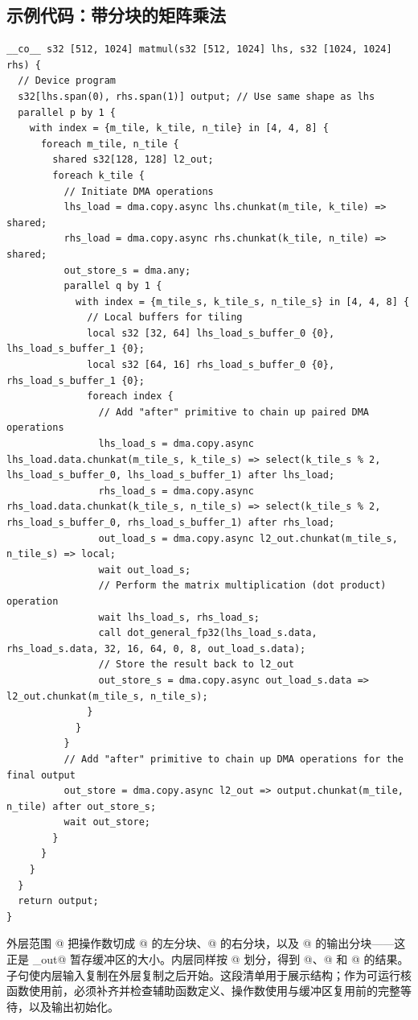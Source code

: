\subsection*{示例代码：带分块的矩阵乘法}

\begin{lstlisting}[language=croqtile,caption={示例代码：带分块的矩阵乘法}]
__co__ s32 [512, 1024] matmul(s32 [512, 1024] lhs, s32 [1024, 1024] rhs) {
  // Device program
  s32[lhs.span(0), rhs.span(1)] output; // Use same shape as lhs
  parallel p by 1 {
    with index = {m_tile, k_tile, n_tile} in [4, 4, 8] {
      foreach m_tile, n_tile {
        shared s32[128, 128] l2_out;
        foreach k_tile {
          // Initiate DMA operations
          lhs_load = dma.copy.async lhs.chunkat(m_tile, k_tile) => shared;
          rhs_load = dma.copy.async rhs.chunkat(k_tile, n_tile) => shared;
          out_store_s = dma.any;
          parallel q by 1 {
            with index = {m_tile_s, k_tile_s, n_tile_s} in [4, 4, 8] {
              // Local buffers for tiling
              local s32 [32, 64] lhs_load_s_buffer_0 {0}, lhs_load_s_buffer_1 {0};
              local s32 [64, 16] rhs_load_s_buffer_0 {0}, rhs_load_s_buffer_1 {0};
              foreach index {
                // Add "after" primitive to chain up paired DMA operations
                lhs_load_s = dma.copy.async lhs_load.data.chunkat(m_tile_s, k_tile_s) => select(k_tile_s % 2, lhs_load_s_buffer_0, lhs_load_s_buffer_1) after lhs_load;
                rhs_load_s = dma.copy.async rhs_load.data.chunkat(k_tile_s, n_tile_s) => select(k_tile_s % 2, rhs_load_s_buffer_0, rhs_load_s_buffer_1) after rhs_load;
                out_load_s = dma.copy.async l2_out.chunkat(m_tile_s, n_tile_s) => local;
                wait out_load_s;
                // Perform the matrix multiplication (dot product) operation
                wait lhs_load_s, rhs_load_s;
                call dot_general_fp32(lhs_load_s.data, rhs_load_s.data, 32, 16, 64, 0, 8, out_load_s.data);
                // Store the result back to l2_out
                out_store_s = dma.copy.async out_load_s.data => l2_out.chunkat(m_tile_s, n_tile_s);
              }
            }
          }
          // Add "after" primitive to chain up DMA operations for the final output
          out_store = dma.copy.async l2_out => output.chunkat(m_tile, n_tile) after out_store_s;
          wait out_store;
        }
      }
    }
  }
  return output;
}
\end{lstlisting}

外层范围 \co@[4, 4, 8]@ 把操作数切成 \co@[128, 256]@ 的左分块、\co@[256, 128]@ 的右分块，以及 \co@[128, 128]@ 的输出分块——这正是 _out@ 暂存缓冲区的大小。内层同样按 \co@[4, 4, 8]@ 划分，得到 \co@[32, 64]@、\co@[64, 16]@ 和 \co@[32, 16]@ 的结果。\co@after@ 子句使内层输入复制在外层复制之后开始。这段清单用于展示结构；作为可运行核函数使用前，必须补齐并检查辅助函数定义、操作数使用与缓冲区复用前的完整等待，以及输出初始化。
